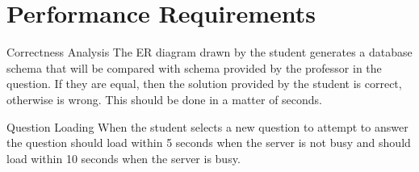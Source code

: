 \chapter{Performance Requirements}

    \begin{section}{Correctness Analysis}
    The ER diagram drawn by the student generates a database schema that will be compared with schema provided by the professor in the question. If they are equal, then the solution provided by the student is correct, otherwise is wrong. This should be done in a matter of seconds.
    \end{section}
    
    \begin{section}{Question Loading}
    When the student selects a new question to attempt to answer the question should load within 5 seconds when the server is not busy and should load within 10 seconds when the server is busy.
    \end{section}
    


